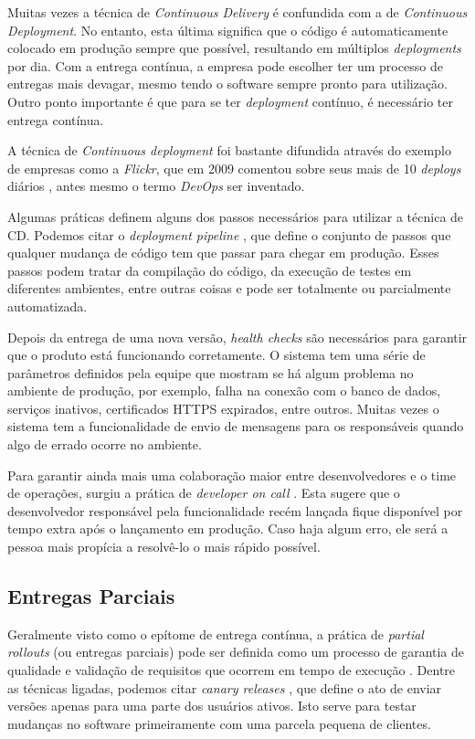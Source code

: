 Muitas vezes a técnica de \emph{Continuous Delivery} é confundida com a de \emph{Continuous Deployment}. No entanto, esta última significa que o código é automaticamente colocado em produção sempre que possível, resultando em múltiplos \emph{deployments} por dia. Com a entrega contínua, a empresa pode escolher ter um processo de entregas mais devagar, mesmo tendo o software sempre pronto para utilização. Outro ponto importante é que para se ter \emph{deployment} contínuo, é necessário ter entrega contínua.

A técnica de \emph{Continuous deployment} foi bastante difundida através do exemplo de empresas como a \emph{Flickr}, que em 2009 comentou sobre seus mais de 10 \emph{deploys} diários \cite{flickrTalk}, antes mesmo o termo \emph{DevOps} ser inventado. 

Algumas práticas definem alguns dos passos necessários para utilizar a técnica de CD. Podemos citar o \emph{deployment pipeline} \cite{devopsBook}, que define o conjunto de passos que qualquer mudança de código tem que passar para chegar em produção. Esses passos podem tratar da compilação do código, da execução de testes em diferentes ambientes, entre outras coisas e pode ser totalmente ou parcialmente automatizada.

Depois da entrega de uma nova versão, \emph{health checks} \cite{devopsBook} são necessários para garantir que o produto está funcionando corretamente. O sistema tem uma série de parâmetros definidos pela equipe que mostram se há algum problema no ambiente de produção, por exemplo, falha na conexão com o banco de dados, serviços inativos, certificados HTTPS expirados, entre outros. Muitas vezes o sistema tem a funcionalidade de envio de mensagens para os responsáveis quando algo de errado ocorre no ambiente.

Para garantir ainda mais uma colaboração maior entre desenvolvedores e o time de operações, surgiu a prática de \emph{developer on call} \cite{devAndDeploymentFB}. Esta sugere que o desenvolvedor responsável pela funcionalidade recém lançada fique disponível por tempo extra após o lançamento em produção. Caso haja algum erro, ele será a pessoa mais propícia a resolvê-lo o mais rápido possível.

\subsection{Entregas Parciais}
Geralmente visto como o epítome de entrega contínua, a prática de \emph{partial rollouts} (ou entregas parciais) pode ser definida como um processo de garantia de qualidade e validação de requisitos que ocorrem em tempo de execução \cite{empiricalStudy2016}. Dentre as técnicas ligadas, podemos citar \emph{canary releases} \cite{continuousDeliveryBook}, que define o ato de enviar versões apenas para uma parte dos usuários ativos. Isto serve para testar mudanças no software primeiramente com uma parcela pequena de clientes.

